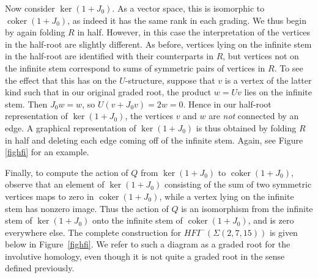 \documentclass[11 pt]{amsart}
\theoremstyle{remark}
\DeclareMathOperator{\coker}{coker}
\def\ker {{\operatorname{ker}}}
\def\HFI {\mathit{HFI}}
\newcommand \HFIm {\HFI^-}
\begin{document}
Now consider $\ker (1 + J_0)$. As a vector space, this is isomorphic to $\coker (1 + J_0)$, as indeed it has the same rank in each grading. We thus begin by again folding $R$ in half. However, in this case the interpretation of the vertices in the half-root are slightly different. As before, vertices lying on the infinite stem in the half-root are identified with their counterparts in $R$, but vertices not on the infinite stem correspond to sums of symmetric pairs of vertices in $R$. To see the effect that this has on the $U$-structure, suppose that $v$ is a vertex of the latter kind such that in our original graded root, the product $w = Uv$ lies on the infinite stem. Then $J_0w = w$, so $U(v + J_0v) = 2w = 0$. Hence in our half-root representation of $\ker (1 + J_0)$, the vertices $v$ and $w$ are \textit{not} connected by an edge. A graphical representation of $\ker (1 + J_0)$ is thus obtained by folding $R$ in half and deleting each edge coming off of the infinite stem. Again, see Figure \ref{fighfi} for an example. 

Finally, to compute the action of $Q$ from $\ker (1 + J_0)$ to $\coker (1 + J_0)$, observe that an element of $\ker (1 + J_0)$ consisting of the sum of two symmetric vertices maps to zero in $\coker (1 + J_0)$, while a vertex lying on the infinite stem has nonzero image. Thus the action of $Q$ is an isomorphism from the infinite stem of $\ker (1 + J_0)$ onto the infinite stem of $\coker (1 + J_0)$, and is zero everywhere else. The complete construction for $\HFIm(\Sigma(2, 7, 15))$ is given below in Figure~\ref{fighfi}. We refer to such a diagram as a graded root for the involutive homology, even though it is not quite a graded root in the sense defined previously.
\end{document}
